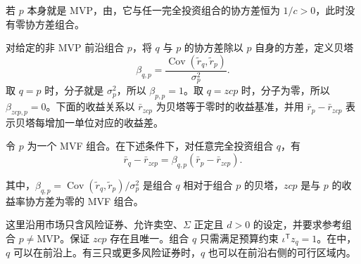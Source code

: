 \begin{center}
\begin{minipage}{\linewidth}
\centering
\renewcommand{\thewjFigure}{\thechapter.S\arabic{wjFigure}}%
%
\par
{}
\end{minipage}
\end{center}

若 $p$ 本身就是 MVP，由，它与任一完全投资组合的协方差恒为 $1/c>0$，此时没有零协方差组合。

对给定的非 MVP 前沿组合 $p$，将 $q$ 与 $p$ 的协方差除以 $p$ 自身的方差，定义贝塔
\[
 \beta_{q,p}=\frac{\operatorname{Cov}(\widetilde r_q,\widetilde r_p)}{\sigma_p^2}.
\]
取 $q=p$ 时，分子就是 $\sigma_p^2$，所以 $\beta_{p,p}=1$。取 $q=zcp$ 时，分子为零，所以 $\beta_{zcp,p}=0$。下面的收益关系以 $\bar r_{zcp}$ 为贝塔等于零时的收益基准，并用 $\bar r_p-\bar r_{zcp}$ 表示贝塔每增加一单位对应的收益差。

\begin{tcolorbox}[knowledge,breakable=false]
 令 $p$ 为一个 MVF 组合。在下述条件下，对任意完全投资组合 $q$，有
\begin{equation}
 \bar r_q-\bar r_{zcp}=\beta_{q,p}(\bar r_p-\bar r_{zcp}).
 \label{eq:wj-12-6}
\end{equation}

其中，$\beta_{q,p}=\operatorname{Cov}(\widetilde r_q,\widetilde r_p)/\sigma_p^2$ 是组合 $q$ 相对于组合 $p$ 的贝塔，$zcp$ 是与 $p$ 的收益率协方差为零的 MVF 组合。

这里沿用市场只含风险证券、允许卖空、$\Sigma$ 正定且 $d>0$ 的设定，并要求参考组合 $p\ne\mathrm{MVP}$。保证 $zcp$ 存在且唯一。组合 $q$ 只需满足预算约束 $\iota^{\mathsf T}z_q=1$。在中，$q$ 可以在前沿上。有三只或更多风险证券时，$q$ 也可以在前沿右侧的可行区域内。
\end{tcolorbox}

